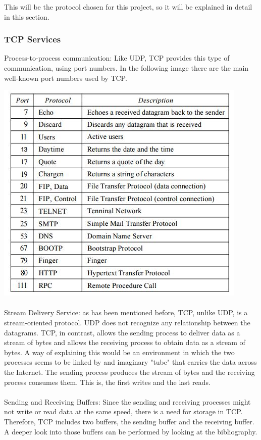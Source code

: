 This will be the protocol chosen for this project, so it will be explained in detail in this section. 

\subsubsection{TCP Services}
Process-to-process communication: Like UDP, TCP provides this type of communication, using port numbers. In the following image there are the main well-known port numbers used by TCP.

\includegraphics{TCP1}

\paragraph{}
Stream Delivery Service: as has been mentioned before, TCP, unlike UDP, is a stream-oriented protocol. UDP does not recognize any relationship between the datagrams. TCP, in contrast, allows the sending process to deliver data as a stream of bytes and allows the receiving process to obtain data as a stream of bytes. A way of explaining this would be an environment in which the two processes seems to be linked by and imaginary "tube" that carries the data across the Internet. The sending process produces the stream of bytes and the receiving process consumes them. This is, the first writes and the last reads. 

\paragraph{}
Sending and Receiving Buffers: Since the sending and receiving processes might not write or read data at the same speed, there is a need for storage in TCP. Therefore, TCP includes two buffers, the sending buffer and the receiving buffer. A deeper look into those buffers can be performed by looking at the bibliography. 

